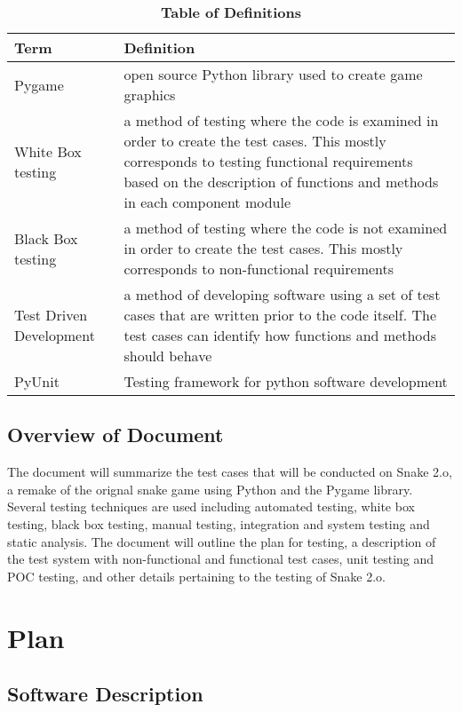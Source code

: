 \documentclass[12pt, titlepage]{article}
\begin{document}
\begin{table}[!htbp]
\caption{\textbf{Table of Definitions}} \label{Table}

\begin{tabularx}{\textwidth}{p{3cm}X}
\toprule
\textbf{Term} & \textbf{Definition}\\
\midrule
Pygame & open source Python library used to create game graphics\\
White Box testing & a method of testing where the code is examined in order to create the test cases. This mostly corresponds to testing functional requirements based on the description of functions and methods in each component module\\
Black Box testing & a method of testing where the code is not examined in order to create the test cases. This mostly corresponds to non-functional requirements\\
Test Driven Development& a method of developing software using a set of test cases that are written prior to the code itself. The test cases can identify how functions and methods should behave\\
PyUnit& Testing framework for python software development\\
\bottomrule
\end{tabularx}

\end{table}	

\subsection{Overview of Document}

The document will summarize the test cases that will be conducted on Snake 2.o, a remake of the orignal snake game using Python and the Pygame library. Several testing techniques are used including automated testing, white box testing, black box testing, manual testing, integration and system testing and static analysis. The document will outline the plan for testing, a description of the test system with non-functional and functional test cases, unit testing and POC testing, and other details pertaining to the testing of Snake 2.o.

\section{Plan}

\subsection{Software Description}
\end{document}
